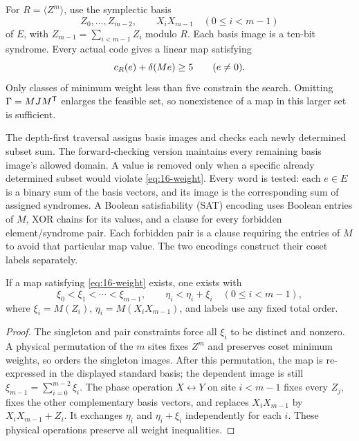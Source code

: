 For \(R=\langle Z^m\rangle\), use the symplectic basis
\[
 Z_0,\ldots,Z_{m-2},\qquad X_iX_{m-1}\quad(0\leq i<m-1)
\]
of \(E\), with \(Z_{m-1}=\sum_{i<m-1}Z_i\) modulo \(R\).
Each basis image is a ten-bit syndrome. Every actual code gives a linear
map satisfying
\begin{equation}\label{eq:16-weight}
 c_R(e)+\delta(Me)\geq5\qquad(e\ne0).
\end{equation}
Only classes of minimum weight less than five constrain the search.
Omitting \(\Gamma=MJM^\mathsf T\) enlarges the feasible set, so
nonexistence of a map in this larger set is sufficient.

The depth-first traversal assigns basis images and checks each newly
determined subset sum. The forward-checking version maintains every
remaining basis image's allowed domain. A value is removed only when a
specific already determined subset would violate \eqref{eq:16-weight}.
Every word is tested: each \(e\in E\) is a binary sum of the basis
vectors, and its image is the corresponding sum of assigned syndromes.
A Boolean satisfiability (SAT) encoding uses Boolean entries of \(M\), XOR chains
for its values, and a clause for every forbidden element/syndrome pair.
Each forbidden pair is a clause
requiring the entries of \(M\) to avoid that particular map value.
The two encodings construct their coset labels separately.

\begin{lemma}\label{lem:16-symmetry}
If a map satisfying \eqref{eq:16-weight} exists, one exists with
\[
 \xi_0<\xi_1<\cdots<\xi_{m-1},\qquad
 \eta_i<\eta_i+\xi_i\quad(0\leq i<m-1),
\]
where \(\xi_i=M(Z_i)\), \(\eta_i=M(X_iX_{m-1})\), and labels use
any fixed total order.
\end{lemma}
\begin{proof}
The singleton and pair constraints force all \(\xi_i\) to be distinct
and nonzero. A physical permutation of the \(m\) sites fixes \(Z^m\)
and preserves coset minimum weights, so orders the singleton images.
After this permutation, the map is re-expressed in the displayed standard
basis; the dependent image is still
\(\xi_{m-1}=\sum_{i=0}^{m-2}\xi_i\).
The phase operation
\(X\leftrightarrow Y\) on site \(i<m-1\) fixes every \(Z_j\),
fixes the other complementary basis vectors, and replaces
\(X_iX_{m-1}\) by \(X_iX_{m-1}+Z_i\). It exchanges
\(\eta_i\) and \(\eta_i+\xi_i\) independently for each \(i\).
These physical operations preserve all weight inequalities.
\end{proof}


